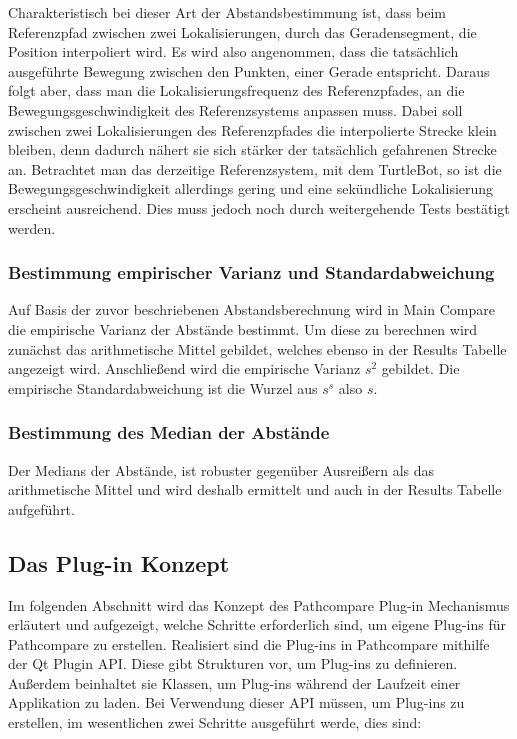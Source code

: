 Charakteristisch bei dieser Art der Abstandsbestimmung ist, dass beim
Referenzpfad zwischen zwei Lokalisierungen, durch das Geradensegment, die
Position interpoliert wird. Es wird also angenommen, dass die tatsächlich
ausgeführte Bewegung zwischen den Punkten, einer Gerade entspricht. Daraus
folgt aber, dass man die Lokalisierungsfrequenz des Referenzpfades, an die
Bewegungsgeschwindigkeit des Referenzsystems anpassen muss. Dabei soll
zwischen zwei Lokalisierungen des Referenzpfades die interpolierte Strecke
klein bleiben, denn dadurch nähert sie sich stärker der tatsächlich gefahrenen
Strecke an. Betrachtet man das derzeitige Referenzsystem, mit dem TurtleBot, so
ist die Bewegungsgeschwindigkeit allerdings gering und eine sekündliche
Lokalisierung erscheint ausreichend. Dies muss jedoch noch durch weitergehende
Tests bestätigt werden.


\subsubsection{Bestimmung empirischer Varianz und Standardabweichung}
Auf Basis der zuvor beschriebenen Abstandsberechnung wird in Main Compare die
empirische Varianz der Abstände bestimmt. Um diese zu berechnen wird zunächst
das arithmetische Mittel gebildet, welches ebenso in der Results Tabelle angezeigt wird.
Anschließend wird die empirische Varianz $s^2$ gebildet. Die empirische Standardabweichung
ist die Wurzel aus $s^s$ also $s$.

\subsubsection{Bestimmung des Median der Abstände}
Der Medians der Abstände, ist robuster gegenüber Ausreißern als das
arithmetische Mittel und wird deshalb ermittelt und auch in der Results Tabelle
aufgeführt.

\subsection{Das Plug-in Konzept}
Im folgenden Abschnitt wird das Konzept des Pathcompare Plug-in Mechanismus
erläutert und aufgezeigt, welche Schritte erforderlich sind, um eigene Plug-ins
für Pathcompare zu erstellen. Realisiert sind die Plug-ins in Pathcompare
mithilfe der Qt Plugin API. Diese gibt Strukturen vor, um Plug-ins zu
definieren. Außerdem beinhaltet sie Klassen, um Plug-ins während der Laufzeit
einer Applikation zu laden.  Bei Verwendung dieser API müssen, um Plug-ins zu
erstellen, im wesentlichen zwei Schritte ausgeführt werde, dies sind:

